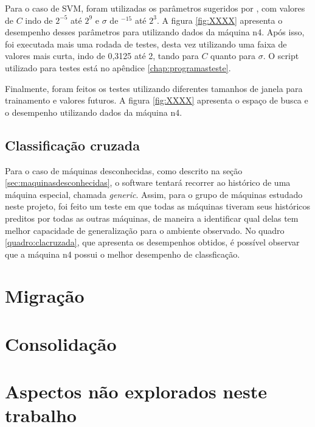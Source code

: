 
Para o caso de SVM, foram utilizadas os parâmetros sugeridos por
, com valores de $C$ indo de $2^{-5}$ até
$2^9$ e $\sigma$ de $^{-15}$ até $2^{3}$. A figura \ref{fig:XXXX} apresenta
o desempenho desses parâmetros para utilizando dados da máquina n4. Após
isso, foi executada mais uma rodada de testes, desta vez utilizando uma
faixa de valores mais curta, indo de 0,3125 até 2, tando para $C$ quanto
para $\sigma$. O script utilizado para testes está no apêndice
\ref{chap:programasteste}.


Finalmente, foram feitos os testes utilizando diferentes tamanhos de janela
para trainamento e valores futuros. A figura \ref{fig:XXXX} apresenta o
espaço de busca e o desempenho utilizando dados da máquina n4.

\subsection{Classificação cruzada}

Para o caso de máquinas desconhecidas, como descrito na seção
\ref{sec:maquinasdesconhecidas}, o software tentará recorrer ao histórico
de uma máquina especial, chamada \emph{generic}. Assim, para o grupo de
máquinas estudado neste projeto, foi feito um teste em que todas as
máquinas tiveram seus históricos preditos por todas as outras máquinas, de
maneira a identificar qual delas tem melhor capacidade de generalização
para o ambiente observado. No quadro \ref{quadro:clacruzada}, que apresenta
os desempenhos obtidos, é possível observar que a máquina n4 possui o
melhor desempenho de classficação.

\section{Migração}

\section{Consolidação}

\section{Aspectos não explorados neste trabalho}


